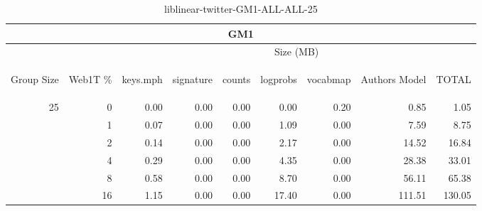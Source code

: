 \begin{center}
\begin{table}[htbp] 
 \begin{center}
\begin{tabular}{ | r | r | r | r | r | r | r | r | r |}
\hline
\multicolumn{9}{|c|}{GM1}\\
\hline
 & & \multicolumn{7}{|c|}{Size (MB)}\\ \cline{3-9}
\begin{sideways}Group Size\end{sideways} & \begin{sideways}Web1T \% \end{sideways} & \begin{sideways}keys.mph\end{sideways} & \begin{sideways}signature\end{sideways} & \begin{sideways}counts\end{sideways} & \begin{sideways}logprobs\end{sideways} & \begin{sideways}vocabmap\end{sideways} & \begin{sideways}Authors Model \end{sideways} & \begin{sideways}TOTAL\end{sideways}\\
\hline
\multirow{5}{*}{25}
 & 0 & 0.00 & 0.00 & 0.00 & 0.00 & 0.20 & 0.85 & 1.05\\ \cline{2-9}
 & 1 & 0.07 & 0.00 & 0.00 & 1.09 & 0.00 & 7.59 & 8.75\\ \cline{2-9}
 & 2 & 0.14 & 0.00 & 0.00 & 2.17 & 0.00 & 14.52 & 16.84\\ \cline{2-9}
 & 4 & 0.29 & 0.00 & 0.00 & 4.35 & 0.00 & 28.38 & 33.01\\ \cline{2-9}
 & 8 & 0.58 & 0.00 & 0.00 & 8.70 & 0.00 & 56.11 & 65.38\\ \cline{2-9}
 & 16 & 1.15 & 0.00 & 0.00 & 17.40 & 0.00 & 111.51 & 130.05\\ \cline{2-9}
\hline
\end{tabular}
\caption{liblinear-twitter-GM1-ALL-ALL-25}
\label{table:liblinear-twitter-GM1-ALL-ALL-25}
\end{center}
 \end{table}
\end{center}

